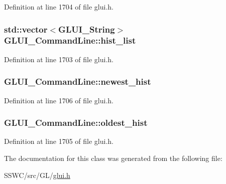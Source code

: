 Definition at line 1704 of file glui.\+h.

\hypertarget{class_g_l_u_i___command_line_abc9dcdc275bb36dee1a9db8d348338b5}{
\subsubsection[{hist\+\_\+list}]{\setlength{\rightskip}{0pt plus 5cm}std\+::vector$<${\bf G\+L\+U\+I\+\_\+\+String}$>$ G\+L\+U\+I\+\_\+\+Command\+Line\+::hist\+\_\+list}}\label{class_g_l_u_i___command_line_abc9dcdc275bb36dee1a9db8d348338b5}


Definition at line 1703 of file glui.\+h.

\hypertarget{class_g_l_u_i___command_line_af4f50f57b5a239d8564619ec0779518d}{
\subsubsection[{newest\+\_\+hist}]{ G\+L\+U\+I\+\_\+\+Command\+Line\+::newest\+\_\+hist}}\label{class_g_l_u_i___command_line_af4f50f57b5a239d8564619ec0779518d}


Definition at line 1706 of file glui.\+h.

\hypertarget{class_g_l_u_i___command_line_a689ee6f9ede7c0f6c2060fd5650b1d22}{
\subsubsection[{oldest\+\_\+hist}]{ G\+L\+U\+I\+\_\+\+Command\+Line\+::oldest\+\_\+hist}}\label{class_g_l_u_i___command_line_a689ee6f9ede7c0f6c2060fd5650b1d22}


Definition at line 1705 of file glui.\+h.



The documentation for this class was generated from the following file\+:\begin{DoxyCompactItemize}
\item 
S\+S\+W\+C/src/\+G\+L/\hyperlink{glui_8h}{glui.\+h}\end{DoxyCompactItemize}
